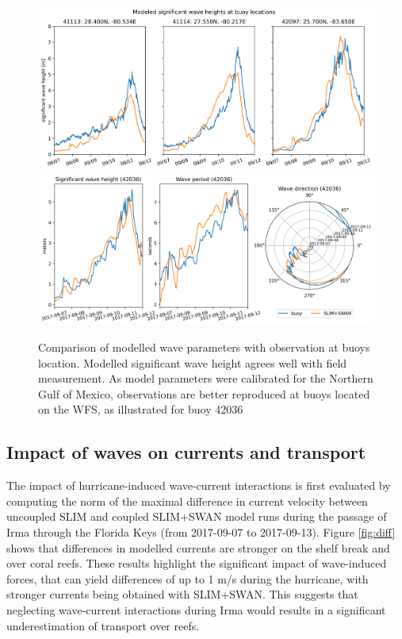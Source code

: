 \documentclass[11pt,a4paper]{article}
\begin{document}
\begin{figure}
    \centering
    \includegraphics[width=.95\textwidth]{fig/hsig_with_map_ww3.png}
    \includegraphics[width=.95\textwidth]{fig/waves_ww3_5km-00002.png}
    \caption{Comparison of modelled wave parameters with observation at buoys location. Modelled significant wave height agrees well with field measurement. As model parameters were calibrated for the Northern Gulf of Mexico, observations are better reproduced at buoys located on the WFS, as illustrated for buoy 42036}
    \label{fig:waves}
\end{figure}

\subsection{Impact of waves on currents and transport}

The impact of hurricane-induced wave-current interactions is first evaluated by computing the norm of the maximal difference in current velocity between uncoupled SLIM and coupled SLIM+SWAN model runs during the passage of Irma through the Florida Keys (from 2017-09-07 to 2017-09-13). Figure \ref{fig:diff} shows that differences in modelled currents are stronger on the shelf break and over coral reefs. These results highlight the significant impact of wave-induced forces, that can yield differences of up to 1 m/s during the hurricane, with stronger currents being obtained with SLIM+SWAN. This suggests that neglecting wave-current interactions during Irma would results in a significant underestimation of transport over reefs.
\end{document}
